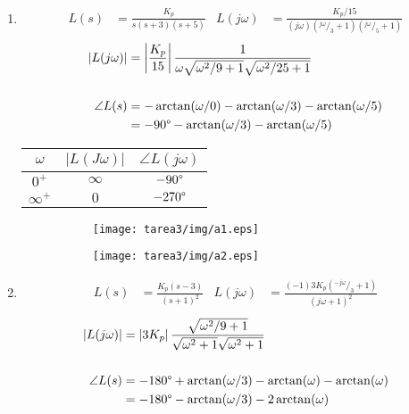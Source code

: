 \begin{ejercicio}
  \renewcommand{\theenumi}{\large\bfseries\alph{enumi}}
  \begin{enumerate}

    \item 
      \begin{align*}
        L(s) &= \frac{K_p}{s(s+3)(s+5)} & L(j\omega) &= \frac{K_p/15}{(j\omega)(^{j\omega}/_3+1)(^{j\omega}/_5+1)}
      \end{align*}
      \begin{align*}
        \left|L(j\omega)\right| &= \left|\frac{K_p}{15}\right| \frac{1}{\omega \sqrt{\omega^2/9+1}\sqrt{\omega^2/25+1}}
        \\\\
        \angle L(s) &= -\arctan(\omega/0) - \arctan(\omega/3) -\arctan(\omega/5)
        \\
        &= -90\degree - \arctan(\omega/3) -\arctan(\omega/5)
      \end{align*}

      \begin{center}
        \begin{tabular}{c | c c}
          $\omega$ & $|L(J\omega)|$ & $\angle L(j\omega)$
          \\ \hline 
          $0^+$ & $\infty$ & $-90\degree$
          \\
          $\infty^+$ & $0$ & $-270\degree$
        \end{tabular}
      \end{center}
      \begin{figure}[H]
        \centering
        \begin{subfigure}{0.45\textwidth}
        \centering
          \texttt{[image: tarea3/img/a1.eps]}
        \end{subfigure}
        \begin{subfigure}{0.45\textwidth}
          \centering
          \texttt{[image: tarea3/img/a2.eps]}
        \end{subfigure}
      \end{figure}

    \item
      \begin{align*}
        L(s) &= \frac{K_p(s-3)}{(s+1)^2} & L(j\omega) &= \frac{(-1) 3 K_p(^{-j\omega}/_3+1)}{(j\omega+1)^2}
      \end{align*}
      \begin{align*}
        \left|L(j\omega)\right| &= \left|3 K_p\right| \frac{\sqrt{\omega^2/9 + 1}}{\sqrt{\omega^2 + 1} \sqrt{\omega^2 + 1}}
        \\\\
        \angle L(s) &= -180\degree + \arctan(\omega/3) - \arctan(\omega) - \arctan(\omega)
        \\
        &= -180\degree - \arctan(\omega/3) - 2 \arctan(\omega)
      \end{align*}


\end{enumerate}
\end{ejercicio}
